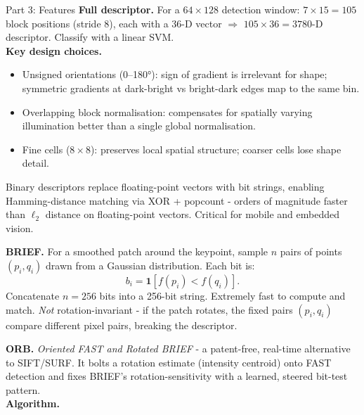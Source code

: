 \documentclass[letterpaper]{article}
\begin{document}
\begin{notes}{Part 3: Features}
\textbf{Full descriptor.} For a $64\times128$ detection window: $7\times15 = 105$ block positions (stride 8), each with a 36-D vector $\Rightarrow$ $105\times36 = 3780$-D descriptor. Classify with a linear SVM.\\

\textbf{Key design choices.}
\begin{itemize}
    \item Unsigned orientations (0--180°): sign of gradient is irrelevant for shape; symmetric gradients at dark-bright vs bright-dark edges map to the same bin.
    \item Overlapping block normalisation: compensates for spatially varying illumination better than a single global normalisation.
    \item Fine cells ($8\times8$): preserves local spatial structure; coarser cells lose shape detail.
\end{itemize}


Binary descriptors replace floating-point vectors with bit strings, enabling Hamming-distance matching via XOR + popcount - orders of magnitude faster than $\ell_2$ distance on floating-point vectors. Critical for mobile and embedded vision.



\textbf{BRIEF.} For a smoothed patch around the keypoint, sample $n$ pairs of points $(p_i, q_i)$ drawn from a Gaussian distribution. Each bit is:
$$b_i = \mathbf{1}[f(p_i) < f(q_i)].$$
Concatenate $n=256$ bits into a 256-bit string. Extremely fast to compute and match. \emph{Not} rotation-invariant - if the patch rotates, the fixed pairs $(p_i, q_i)$ compare different pixel pairs, breaking the descriptor.


\textbf{ORB.} \emph{Oriented FAST and Rotated BRIEF} - a patent-free, real-time alternative to SIFT/SURF. It bolts a rotation estimate (intensity centroid) onto FAST detection and fixes BRIEF's rotation-sensitivity with a learned, steered bit-test pattern.\\


\textbf{Algorithm.}


\end{notes}
\end{document}
